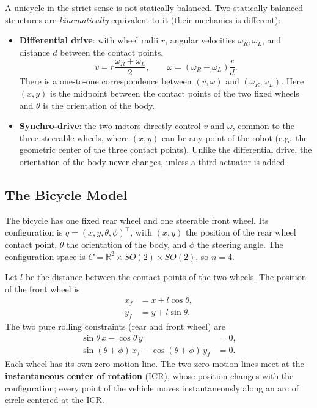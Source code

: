 \begin{nb}
A unicycle in the strict sense is not statically balanced. Two
statically balanced structures are \emph{kinematically} equivalent to
it (their mechanics is different):
\begin{itemize}
    \item \textbf{Differential drive}: with wheel radii \( r \),
          angular velocities \( \omega_R, \omega_L \), and distance
          \( d \) between the contact points,
          \[
          v = r \frac{\omega_R + \omega_L}{2},
          \qquad
          \omega = (\omega_R - \omega_L) \frac{r}{d}.
          \]
          There is a one-to-one correspondence between \( (v, \omega) \)
          and \( (\omega_R, \omega_L) \). Here \( (x, y) \) is the
          midpoint between the contact points of the two fixed wheels
          and \( \theta \) is the orientation of the body.
    \item \textbf{Synchro-drive}: the two motors directly control
          \( v \) and \( \omega \), common to the three steerable
          wheels, where \( (x, y) \) can be any point of the robot
          (e.g.\ the geometric center of the three contact points).
          Unlike the differential drive, the orientation of the body
          never changes, unless a third actuator is added.
\end{itemize}
\end{nb}

\subsection{The Bicycle Model}
\label{subsec:bicycle-model}

The bicycle has one fixed rear wheel and one steerable front wheel.
Its configuration is \( q = (x, y, \theta, \phi)^\top \), with
\( (x, y) \) the position of the rear wheel contact point, \( \theta \)
the orientation of the body, and \( \phi \) the steering angle. The
configuration space is
\( C = \mathbb{R}^2 \times SO(2) \times SO(2) \), so \( n = 4 \).

Let \( l \) be the distance between the contact points of the two
wheels. The position of the front wheel is
\begin{align}
    x_f &= x + l \cos\theta, \\
    y_f &= y + l \sin\theta.
\end{align}
The two pure rolling constraints (rear and front wheel) are
\begin{align}
    \sin\theta \, \dot{x} - \cos\theta \, \dot{y} &= 0, \\
    \sin(\theta + \phi) \, \dot{x}_f
    - \cos(\theta + \phi) \, \dot{y}_f &= 0.
\end{align}
Each wheel has its own zero-motion line. The two zero-motion lines meet
at the \textbf{instantaneous center of rotation} (ICR), whose position
changes with the configuration; every point of the vehicle moves
instantaneously along an arc of circle centered at the ICR.

